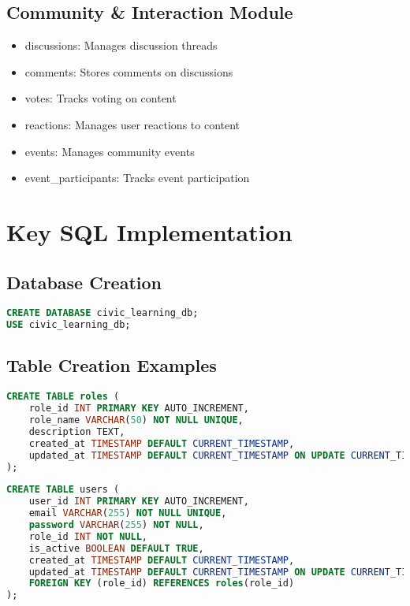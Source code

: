 \documentclass[12pt]{report}
\begin{document}
    \subsection{Community \& Interaction Module}
    \begin{itemize}
        \item discussions: Manages discussion threads
        \item comments: Stores comments on discussions
        \item votes: Tracks voting on content
        \item reactions: Manages user reactions to content
        \item events: Manages community events
        \item event\_participants: Tracks event participation
    \end{itemize}
    
    \section{Key SQL Implementation}
    
    \subsection{Database Creation}
    \begin{lstlisting}[language=SQL, caption=Database Creation]
CREATE DATABASE civic_learning_db;
USE civic_learning_db;
    \end{lstlisting}
    
    \subsection{Table Creation Examples}
    \begin{lstlisting}[language=SQL, caption=Roles Table Creation]
CREATE TABLE roles (
    role_id INT PRIMARY KEY AUTO_INCREMENT,
    role_name VARCHAR(50) NOT NULL UNIQUE,
    description TEXT,
    created_at TIMESTAMP DEFAULT CURRENT_TIMESTAMP,
    updated_at TIMESTAMP DEFAULT CURRENT_TIMESTAMP ON UPDATE CURRENT_TIMESTAMP
);
    \end{lstlisting}
    
    \begin{lstlisting}[language=SQL, caption=Users Table Creation]
CREATE TABLE users (
    user_id INT PRIMARY KEY AUTO_INCREMENT,
    email VARCHAR(255) NOT NULL UNIQUE,
    password VARCHAR(255) NOT NULL,
    role_id INT NOT NULL,
    is_active BOOLEAN DEFAULT TRUE,
    created_at TIMESTAMP DEFAULT CURRENT_TIMESTAMP,
    updated_at TIMESTAMP DEFAULT CURRENT_TIMESTAMP ON UPDATE CURRENT_TIMESTAMP,
    FOREIGN KEY (role_id) REFERENCES roles(role_id)
);
    \end{lstlisting}
    
\end{document}
